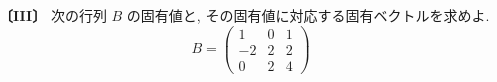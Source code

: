 \noindent\textbf{〔III〕}
次の行列 $B$ の固有値と, その固有値に対応する固有ベクトルを求めよ.
\[
B=\begin{pmatrix}
1 & 0 & 1\\
-2 & 2 & 2\\
0 & 2 & 4
\end{pmatrix}
\]
